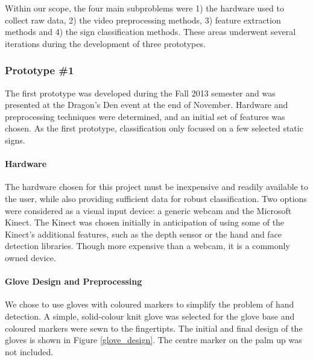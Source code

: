 \documentclass[12pt]{article}
\begin{document}
Within our scope, the four main subproblems were 1) the hardware used to collect raw data, 2) the video preprocessing methods, 3) feature extraction methods and 4) the sign classification methods. These areas underwent several iterations during the development of three prototypes. 

\subsubsection{Prototype \#1}
The first prototype was developed during the Fall 2013 semester and was presented at the Dragon’s Den event at the end of November. Hardware and preprocessing techniques were determined, and an initial set of features was chosen.  As the first prototype, classification only focused on a few selected static signs.

\paragraph{Hardware}
The hardware chosen for this project must be inexpensive and readily available to the user, while also providing sufficient data for robust classification. Two options were considered as a visual input device: a generic webcam and the Microsoft Kinect. The Kinect was chosen initially in anticipation of using some of the Kinect's additional features, such as the depth sensor or the hand and face detection libraries. Though more expensive than a webcam, it is a commonly owned device. 

\paragraph{Glove Design and Preprocessing}
We chose to use gloves with coloured markers to simplify the problem of hand detection. A simple, solid-colour knit glove was selected for the glove base and coloured markers were sewn to the fingertipts. The initial and final design of the gloves is shown in Figure \ref{glove_design}. The centre marker on the palm up was not included.
\end{document}
